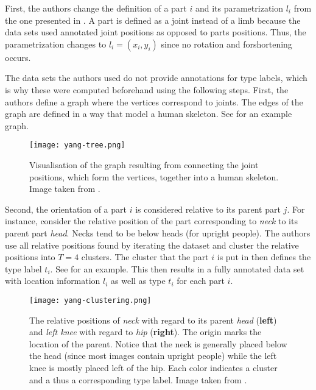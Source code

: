 First, the authors change the definition of a part $i$ and its parametrization $l_i$ from the one presented in \cite{felzenszwalb_pictorial_2005}.
A part is defined as a joint instead of a limb because the data sets used annotated joint positions as opposed to parts positions.
Thus, the parametrization changes to $l_i = (x_i, y_i)$ since no rotation and forshortening occurs.

The data sets the authors used do not provide annotations for type labels, which is why these were computed beforehand using the following steps.
First, the authors define a graph where the vertices correspond to joints.
The edges of the graph are defined in a way that model a human skeleton.
See  for an example graph.

\begin{figure}[htb!]
    \centering
    \texttt{[image: yang-tree.png]}
    \caption{Visualisation of the graph resulting from connecting the joint positions, which form the vertices, together into a human skeleton. Image taken from \cite{yang_articulated_2011}.}
    \label{fig:yang-tree}
\end{figure}

Second, the orientation of a part $i$ is considered relative to its parent part $j$.
For instance, consider the relative position of the part corresponding to \textit{neck} to its parent part \textit{head}.
Necks tend to be below heads (for upright people).
The authors use all relative positions found by iterating the dataset and cluster the relative positions into $T=4$ clusters.
The cluster that the part $i$ is put in then defines the type label $t_i$.
See  for an example.
This then results in a fully annotated data set with location information $l_i$ as well as type $t_i$ for each part $i$.

\begin{figure}[htb!]
    \centering
    \texttt{[image: yang-clustering.png]}
    \caption{The relative positions of \textit{neck} with regard to     its parent \textit{head} (\textbf{left}) and \textit{left knee} with regard to \textit{hip} (\textbf{right}). The origin marks the location of the parent. Notice that the neck is generally placed below the head (since most images contain upright people) while the left knee is mostly placed left of the hip. Each color indicates a cluster and a thus a corresponding type label. Image taken from \cite{yang_articulated_2011}.}
    \label{fig:yang-clustering}
\end{figure}

